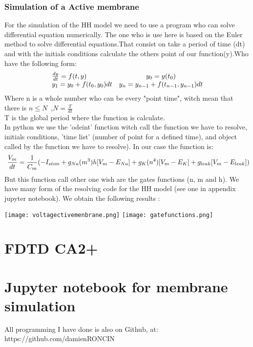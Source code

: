 \documentclass[a4paper,10pt]{report}
\begin{document}
\subsection{Simulation of a Active membrane}
For the simulation of the HH model we need to use a program who can solve differential equation numerically. The one who is use here is based on the Euler method to solve differential equations.That consist on take a period of time (dt) and with the initials conditions calculate the others point of our function(y).Who have the following form: \\
$$
\begin{array}{l c} 
\frac{dy}{dt}=f(t,y) & y_{0}=y(t_{0})\\
y_{1}=y_{0}+f(t_{0},y_{0})dt & y_{n}=y_{n-1}+f(t_{n-1},y_{n-1})dt \\
\end{array}
$$
Where n is a whole number who can be every "point time", witch mean that there is $n \leq N$\ ,$N=\frac{T}{dt}$ \\
 T is the global period where the function is calculate.  \\

In python we use the 'odeint' function witch call the function we have to resolve, initials conditions, 'time list' (number of point for a defined time), and object called by the function we have to resolve). 
In our case the function is:
$$
\ \frac{V_{m}}{dt} = \frac{1}{C_{m}}(-I_{stim}+g_{Na}(m^3)h[V_{m}-E_{Na}]+g_{K}(n^4)[V_{m}-E_{K}]+g_{leak}[V_{m}-E_{leak}]) \\
$$
But this function call other one wish are the gates functions (n, m and h). We have many form of the resolving code for the HH model (see one in appendix jupyter notebook).
We obtain the following results :

\begin{center}
\texttt{[image: voltagectivemenbrane.png]} 
\label{fig1}
\texttt{[image: gatefunctions.png]} 
\label{fig1}
\end{center}

\chapter{ FDTD CA2+ }




  

\appendix
\chapter{Jupyter notebook for membrane simulation}
All programming I have done is also on Github, at: \\
https://github.com/damienRONCIN\\


\end{document}
